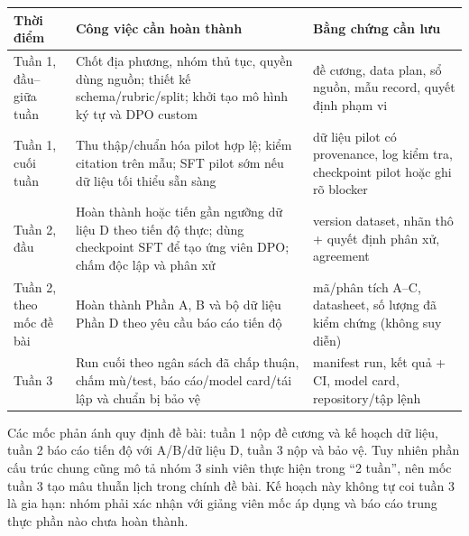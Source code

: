 \documentclass[11pt,a4paper]{article}
\begin{document}
{\def\LTcaptype{none} %
\begin{longtable}[]{@{}
  >{\raggedright\arraybackslash}p{}
  >{\raggedright\arraybackslash}p{}
  >{\raggedright\arraybackslash}p{}@{}}
\toprule\noalign{}
\begin{minipage}[b]{\linewidth}\raggedright
Thời điểm
\end{minipage} & \begin{minipage}[b]{\linewidth}\raggedright
Công việc cần hoàn thành
\end{minipage} & \begin{minipage}[b]{\linewidth}\raggedright
Bằng chứng cần lưu
\end{minipage} \\
\midrule\noalign{}
\endhead
\bottomrule\noalign{}
\endlastfoot
Tuần 1, đầu--giữa tuần & Chốt địa phương, nhóm thủ tục, quyền dùng
nguồn; thiết kế schema/rubric/split; khởi tạo mô hình ký tự và DPO
custom & đề cương, data plan, sổ nguồn, mẫu record, quyết định phạm
vi \\
Tuần 1, cuối tuần & Thu thập/chuẩn hóa pilot hợp lệ; kiểm citation trên
mẫu; SFT pilot sớm nếu dữ liệu tối thiểu sẵn sàng & dữ liệu pilot có
provenance, log kiểm tra, checkpoint pilot hoặc ghi rõ blocker \\
Tuần 2, đầu & Hoàn thành hoặc tiến gần ngưỡng dữ liệu D theo tiến độ
thực; dùng checkpoint SFT để tạo ứng viên DPO; chấm độc lập và phân xử &
version dataset, nhãn thô + quyết định phân xử, agreement \\
Tuần 2, theo mốc đề bài & Hoàn thành Phần A, B và bộ dữ liệu Phần D theo
yêu cầu báo cáo tiến độ & mã/phân tích A--C, datasheet, số lượng đã kiểm
chứng (không suy diễn) \\
Tuần 3 & Run cuối theo ngân sách đã chấp thuận, chấm mù/test, báo
cáo/model card/tái lập và chuẩn bị bảo vệ & manifest run, kết quả + CI,
model card, repository/tập lệnh \\
\end{longtable}
}

Các mốc phản ánh quy định đề bài: tuần 1 nộp đề cương và kế hoạch dữ
liệu, tuần 2 báo cáo tiến độ với A/B/dữ liệu D, tuần 3 nộp và bảo vệ.
Tuy nhiên phần cấu trúc chung cũng mô tả nhóm 3 sinh viên thực hiện
trong ``2 tuần'', nên mốc tuần 3 tạo mâu thuẫn lịch trong chính đề bài.
Kế hoạch này không tự coi tuần 3 là gia hạn: nhóm phải xác nhận với
giảng viên mốc áp dụng và báo cáo trung thực phần nào chưa hoàn thành.
\end{document}
